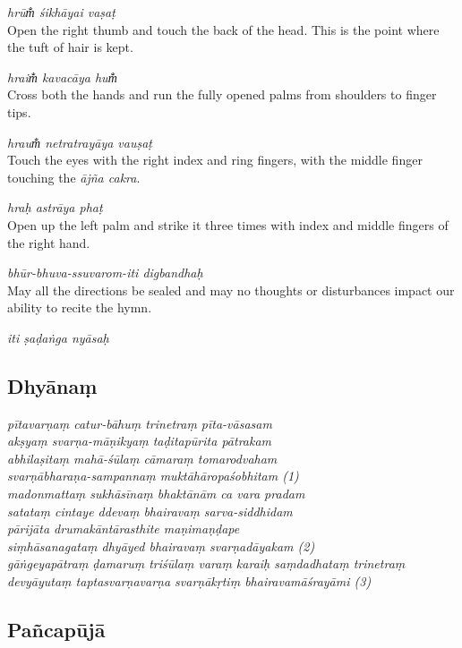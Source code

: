 \documentclass[12pt,oneside,a4paper]{article}
\newenvironment{shloka}[1]
  {\bigskip\center#1\varwidth{\linewidth}}
  {\endvarwidth\endcenter\bigskip}
\newcommand{\tl}[1]{\emph{#1}}
\begin{document}
\tl{hrūm̐ śikhāyai vaṣaṭ}\\
Open the right thumb and touch the back of the head. This is the point where
the tuft of hair is kept.

\tl{hraim̐ kavacāya hum̐}\\
Cross both the hands and run the fully opened palms from shoulders to
finger tips.

\tl{hraum̐ netratrayāya vauṣaṭ}\\
Touch the eyes with the right index and ring fingers, with the middle finger
touching the \tl{ājña cakra}.

\tl{hraḥ astrāya phaṭ}\\
Open up the left palm and strike it three times with index and middle fingers
of the right hand.

\tl{bhūr-bhuva-ssuvarom-iti digbandhaḥ}\\
May all the directions be sealed and may no thoughts or disturbances impact our
ability to recite the hymn.

\begin{shloka}\itshape
  iti ṣaḍaṅga nyāsaḥ
\end{shloka}

\subsection{Dhyānaṃ}

\begin{shloka}\itshape
pītavarṇaṃ catur-bāhuṃ trinetraṃ pīta-vāsasam\\
akṣyaṃ svarṇa-māṇikyaṃ taḍitapūrita pātrakam\\
abhilaṣitaṃ mahā-śūlaṃ cāmaraṃ tomarodvaham\\
svarṇābharaṇa-sampannaṃ muktāhāropaśobhitam (1)\\

madonmattaṃ sukhāsīnaṃ bhaktānām ca vara pradam\\
satataṃ cintaye ddevaṃ bhairavaṃ sarva-siddhidam\\
pārijāta drumakāntārasthite maṇimaṇḍape\\
siṃhāsanagataṃ dhyāyed bhairavaṃ svarṇadāyakam (2)\\

gāṅgeyapātraṃ ḍamaruṃ triśūlaṃ varaṃ karaiḥ saṃdadhataṃ trinetraṃ\\
devyāyutaṃ taptasvarṇavarṇa svarṇākṛtiṃ bhairavamāśrayāmi (3)
\end{shloka}

\subsection{Pañcapūjā}
\end{document}
